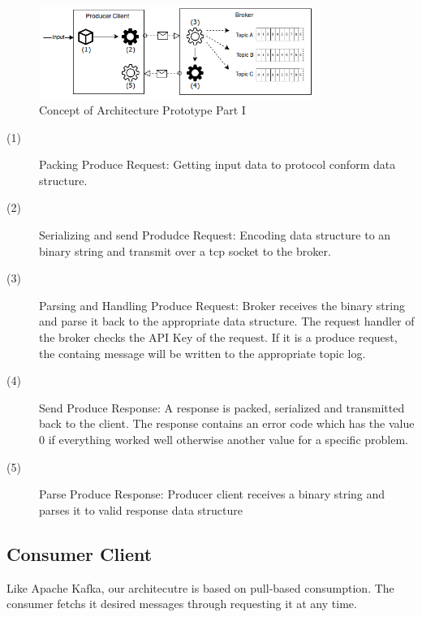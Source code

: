 \begin{figure}[H]
    \centering
    \includegraphics[width=0.8\textwidth]{images/concept_producer.png}
    \caption{Concept of Architecture Prototype Part I}
    \label{fig:conept-producer}
\end{figure}

\begin{description}
    \item [(1)] 
        {Packing Produce Request: Getting input data to protocol conform data structure.}
    \item [(2)] 
        {Serializing and send Produdce Request: Encoding data structure to an
            binary  string and transmit over a tcp socket to the broker.}
    \item [(3)] 
        {Parsing and Handling Produce Request: Broker receives the binary string
            and parse it back to the appropriate data structure. The request
            handler of the  broker checks the API Key of the request. If it is a
            produce request, the containg message will be written to the
            appropriate topic log.}
    \item [(4)] 
        {Send Produce Response: A response is packed, serialized and transmitted
            back to the client. The response contains an error code which has
            the value 0 if everything worked well otherwise another value for a
            specific problem. }
    \item [(5)] 
        {Parse Produce Response: Producer client receives a binary string and
            parses it to valid response data structure }
\end{description}

\subsection{Consumer Client}
Like Apache Kafka, our architecutre is based on pull-based consumption. The consumer
fetchs it desired messages through requesting it at any time. 

